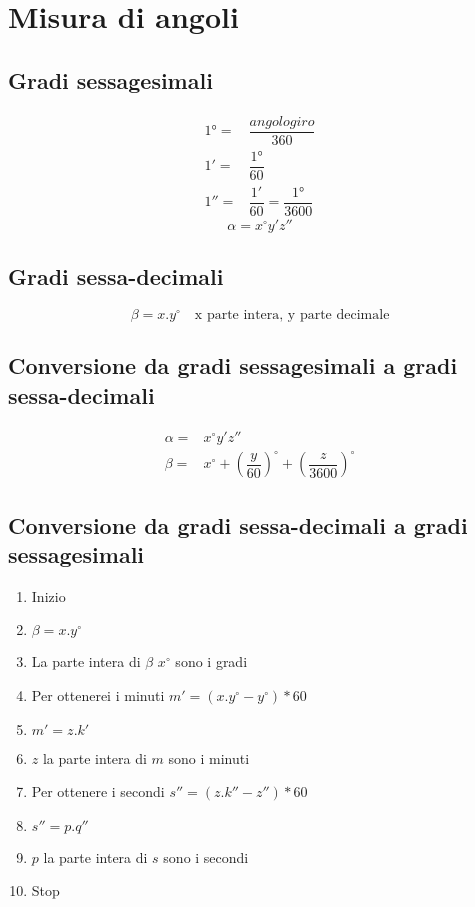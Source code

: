 \chapter{Misura di angoli}
\section{Gradi sessagesimali}
\begin{align}
\ang{1}=&\dfrac{angolo giro}{360}\\
\ang{;1;}=&\dfrac{\ang{1}}{60}\\
\ang{;;1}=&\dfrac{\ang{;1;}}{60}=\dfrac{\ang{1}}{3600}
\end{align}
\begin{equation}
\alpha=x^\circ y'z''
\end{equation}
\section{Gradi sessa-decimali}
\begin{equation}
\beta=x.y^\circ\quad\text{x parte intera, y parte decimale}
\end{equation}
\section{Conversione da gradi sessagesimali a gradi sessa-decimali}
\begin{align}
\alpha=&x^\circ y'z''\\
\beta=&x^\circ+\left(\dfrac{y}{60}\right)^\circ+\left(\dfrac{z}{3600}\right)^\circ
\end{align}
\section{Conversione da gradi sessa-decimali  a gradi sessagesimali}
\begin{enumerate}
	\item Inizio
	\item $\beta=x.y^\circ$
	\item La parte intera di $\beta$ $x^\circ$ sono i gradi
	\item Per ottenerei i minuti $m'=(x.y^\circ-y^\circ)*60$
	\item $m'=z.k'$
	\item $z$ la parte intera di $m$ sono i minuti 
	\item Per ottenere i secondi
	$s''=(z.k''-z'')*60$ 
	\item $s''=p.q''$
	\item $p$ la parte intera di $s$ sono i secondi
	\item Stop
\end{enumerate}
